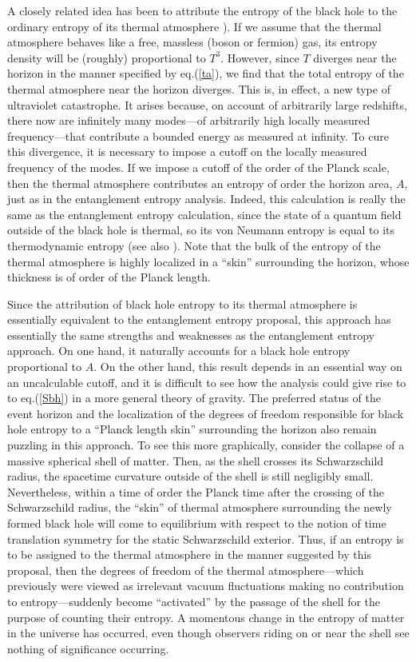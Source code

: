 \documentclass[12pt]{article}
\begin{document}
A closely related idea has been to attribute the entropy of the black
hole to the ordinary entropy of its thermal atmosphere \cite{th}). If
we assume that the thermal atmosphere behaves like a free, massless
(boson or fermion) gas, its entropy density will be (roughly)
proportional to $T^3$. However, since $T$ diverges near the horizon in
the manner specified by eq.(\ref{ta}), we find that the total entropy
of the thermal atmosphere near the horizon diverges.  This is, in
effect, a new type of ultraviolet catastrophe. It arises because, on
account of arbitrarily large redshifts, there now are infinitely many
modes---of arbitrarily high locally measured frequency---that
contribute a bounded energy as measured at infinity.  To cure this
divergence, it is necessary to impose a cutoff on the locally measured
frequency of the modes. If we impose a cutoff of the order of the
Planck scale, then the thermal atmosphere contributes an entropy of
order the horizon area, $A$, just as in the entanglement entropy
analysis. Indeed, this calculation is really the same as the
entanglement entropy calculation, since the state of a quantum field
outside of the black hole is thermal, so its von Neumann entropy is
equal to its thermodynamic entropy (see also \cite{mu}). Note that the bulk
of the entropy of the thermal atmosphere is highly localized in a
``skin'' surrounding the horizon, whose thickness is of order of the
Planck length.

Since the attribution of black hole entropy to its thermal atmosphere
is essentially equivalent to the entanglement entropy proposal, this
approach has essentially the same strengths and weaknesses as the
entanglement entropy approach. On one hand, it naturally accounts for
a black hole entropy proportional to $A$. On the other hand, this
result depends in an essential way on an uncalculable cutoff, and it
is difficult to see how the analysis could give rise to to
eq.(\ref{Sbh}) in a more general theory of gravity. The preferred
status of the event horizon and the localization of the degrees of
freedom responsible for black hole entropy to a ``Planck length skin''
surrounding the horizon also remain puzzling in this approach.  To see
this more graphically, consider the collapse of a massive spherical
shell of matter. Then, as the shell crosses its Schwarzschild radius,
the spacetime curvature outside of the shell is still negligibly
small.  Nevertheless, within a time of order the Planck time after
the crossing of the Schwarzschild radius, the ``skin'' of thermal
atmosphere surrounding the newly formed black hole will come to
equilibrium with respect to the notion of time translation symmetry
for the static Schwarzschild exterior. Thus, if an entropy is to be
assigned to the thermal atmosphere in the manner suggested by this
proposal, then the degrees of freedom of the thermal
atmosphere---which previously were viewed as irrelevant vacuum
fluctuations making no contribution to entropy---suddenly become
``activated'' by the passage of the shell for the purpose of counting
their entropy. A momentous change in the entropy of matter in the
universe has occurred, even though observers riding on or near the
shell see nothing of significance occurring.
\end{document}
